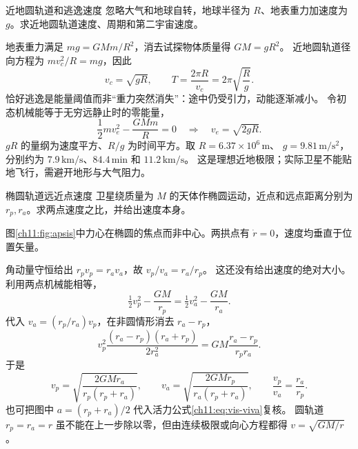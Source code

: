 \begin{origexamplebox}{近地圆轨道和逃逸速度}\label{ch11:ex:01}
忽略大气和地球自转，地球半径为 $R$、地表重力加速度为 $g$。求近地圆轨道速度、周期和第二宇宙速度。
\end{origexamplebox}
\begin{xesolution}
地表重力满足 $mg=GMm/R^2$，消去试探物体质量得 $GM=gR^2$。
近地圆轨道径向方程为 $mv_c^2/R=mg$，因此
\[
 \boxed{v_c=\sqrt{gR}},\qquad
 \boxed{T=\frac{2\pi R}{v_c}=2\pi\sqrt{\frac Rg}}.
\]
恰好逃逸是能量阈值而非“重力突然消失”：途中仍受引力，动能逐渐减小。
令初态机械能等于无穷远静止时的零能量，
\[
 \frac12mv_e^2-\frac{GMm}{R}=0
 \quad\Longrightarrow\quad\boxed{v_e=\sqrt{2gR}}.
\]
$gR$ 的量纲为速度平方、$R/g$ 为时间平方。取 $R=6.37\times10^6\,\mathrm m$、
$g=9.81\,\mathrm{m/s^2}$，分别约为 $7.9\,\mathrm{km/s}$、$84.4\,\mathrm{min}$ 和 $11.2\,\mathrm{km/s}$。
这是理想近地极限；实际卫星不能贴地飞行，需避开地形与大气阻力。
\end{xesolution}

\begin{origexamplebox}{椭圆轨道远近点速度}\label{ch11:ex:02}
卫星绕质量为 $M$ 的天体作椭圆运动，近点和远点距离分别为 $r_p,r_a$。求两点速度之比，并给出速度本身。
\end{origexamplebox}
\begin{xesolution}
图\ref{ch11:fig:apsis}中力心在椭圆的焦点而非中心。两拱点有 $\dot r=0$，速度均垂直于位置矢量。
\begin{center}
\label{ch11:fig:apsis}
\end{center}
角动量守恒给出 $r_pv_p=r_av_a$，故 $v_p/v_a=r_a/r_p$。
这还没有给出速度的绝对大小。利用两点机械能相等，
\[
 \tfrac12v_p^2-\frac{GM}{r_p}
 =\tfrac12v_a^2-\frac{GM}{r_a}.
\]
代入 $v_a=(r_p/r_a)v_p$，在非圆情形消去 $r_a-r_p$，
\[
 v_p^2\frac{(r_a-r_p)(r_a+r_p)}{2r_a^2}
 =GM\frac{r_a-r_p}{r_pr_a}.
\]
于是
\[
 \boxed{v_p=\sqrt{\frac{2GMr_a}{r_p(r_p+r_a)}}},\qquad
 \boxed{v_a=\sqrt{\frac{2GMr_p}{r_a(r_p+r_a)}}},\qquad
 \boxed{\frac{v_p}{v_a}=\frac{r_a}{r_p}}.
\]
也可把图中 $a=(r_p+r_a)/2$ 代入活力公式\eqref{ch11:eq:vis-viva}复核。
圆轨道 $r_p=r_a=r$ 虽不能在上一步除以零，但由连续极限或向心方程都得 $v=\sqrt{GM/r}$。
\end{xesolution}

